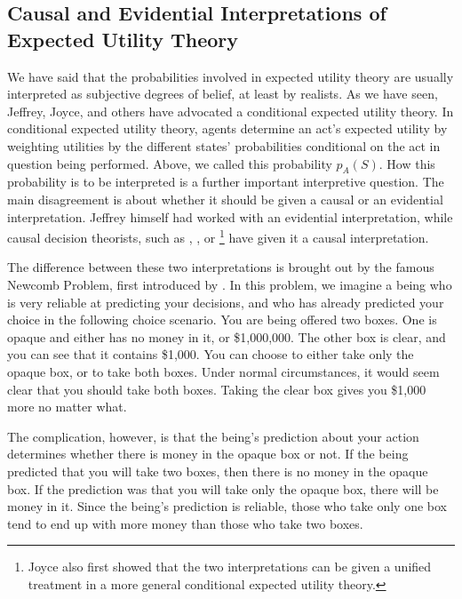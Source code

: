 \subsection{Causal and Evidential Interpretations of Expected Utility Theory}\label{subs33}

We have said that the probabilities involved in expected utility theory are usually interpreted as subjective degrees of belief, at least by realists. As we have seen, Jeffrey, Joyce, and others have advocated a conditional expected utility theory. In conditional expected utility theory, agents determine an act's expected utility by weighting utilities by the different states' probabilities conditional on the act in question being performed. Above, we called this probability $p_{A} (S)$. How this probability is to be interpreted is a further important interpretive question. The main disagreement is about whether it should be given a causal or an evidential interpretation. Jeffrey himself had worked with an evidential interpretation, while causal decision theorists, such as \citet{GibbardHarper1978}, \citet{Armendt1986}, or \citet{Joyce1999}\footnote{Joyce also first showed that the two interpretations can be given a unified treatment in a more general conditional expected utility theory.} have given it a causal interpretation.

The difference between these two interpretations is brought out by the famous Newcomb Problem, first introduced by \citet{Nozick1969}. In this problem, we imagine a being who is very reliable at predicting your decisions, and who has already predicted your choice in the following choice scenario. You are being offered two boxes. One is opaque and either has no money in it, or \$1,000,000. The other box is clear, and you can see that it contains \$1,000. You can choose to either take only the opaque box, or to take both boxes. Under normal circumstances, it would seem clear that you should take both boxes. Taking the clear box gives you \$1,000 more no matter what.

The complication, however, is that the being's prediction about your action determines whether there is money in the opaque box or not. If the being predicted that you will take two boxes, then there is no money in the opaque box. If the prediction was that you will take only the opaque box, there will be money in it. Since the being's prediction is reliable, those who take only one box tend to end up with more money than those who take two boxes.

